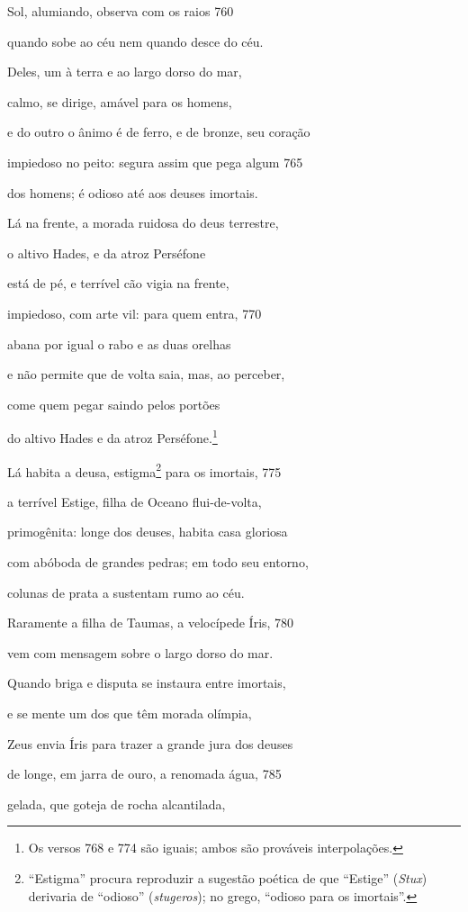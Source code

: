 Sol, alumiando, observa com os raios \num{760}

quando sobe ao céu nem quando desce do céu.

Deles, um à terra e ao largo dorso do mar,

calmo, se dirige, amável para os homens,

e do outro o ânimo é de ferro, e de bronze, seu coração

impiedoso no peito: segura assim que pega algum \num{765}

dos homens; é odioso até aos deuses imortais.

\quad{}Lá na frente, a morada ruidosa do deus terrestre,

o altivo Hades, e da atroz Perséfone

está de pé, e terrível cão vigia na frente,

impiedoso, com arte vil: para quem entra, \num{770}

abana por igual o rabo e as duas orelhas

e não permite que de volta saia, mas, ao perceber,

come quem pegar saindo pelos portões

do altivo Hades e da atroz Perséfone.\footnote{Os versos 768 e 774 são iguais; ambos são prováveis interpolações.}

\quad{}Lá habita a deusa, estigma\footnote{``Estigma'' procura reproduzir a sugestão poética de que
``Estige'' (\emph{Stux}) derivaria de ``odioso'' (\emph{stugeros}); no
grego, ``odioso para os imortais''.} para os imortais, \num{775}

a terrível Estige, filha de Oceano flui-de-volta,

primogênita: longe dos deuses, habita casa gloriosa

com abóboda de grandes pedras; em todo seu entorno,

colunas de prata a sustentam rumo ao céu.

Raramente a filha de Taumas, a velocípede Íris, \num{780}

vem com mensagem sobre o largo dorso do mar.

Quando briga e disputa se instaura entre imortais,

e se mente um dos que têm morada olímpia,

Zeus envia Íris para trazer a grande jura dos deuses

de longe, em jarra de ouro, a renomada água, \num{785}

gelada, que goteja de rocha alcantilada,

